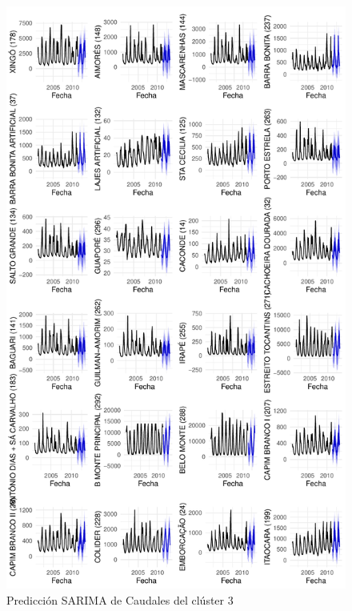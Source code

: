 \documentclass[12pt,oneside]{book}\usepackage[]{graphicx}\usepackage[]{color}
\makeatletter
\def\maxwidth{ %
  \ifdim\Gin@nat@width>\linewidth
    \linewidth
  \else
    \Gin@nat@width
  \fi
}
\newenvironment{knitrout}{}{} %
\theoremstyle{definition} %
\makeatother
\begin{document}
\begin{knitrout}
\color{fgcolor}\begin{figure}[h]

{\centering \includegraphics[width=\maxwidth,height=0.85\textheight]{figure/unnamed-chunk-88-1} 

}

\caption{\label{fig:pred_cl3} Predicción SARIMA de Caudales del clúster 3}\label{fig:unnamed-chunk-88}
\end{figure}


\end{knitrout}
\end{document}
